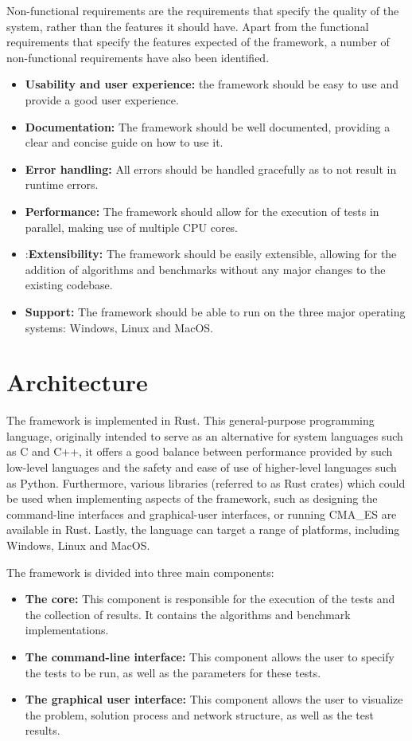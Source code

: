 Non-functional requirements are the requirements that specify the quality of the system, rather than the features it should have.
Apart from the functional requirements that specify the features expected of the framework, a number of non-functional requirements have also been identified.

\begin{itemize}
    \item \textbf{Usability and user experience:} the framework should be easy to use and provide a good user experience.
    \item \textbf{Documentation:} The framework should be well documented, providing a clear and concise guide on how to use it.
    \item \textbf{Error handling:} All errors should be handled gracefully as to not result in runtime errors.
    \item \textbf{Performance:} The framework should allow for the execution of tests in parallel, making use of multiple CPU cores.
    \item:\textbf{Extensibility:} The framework should be easily extensible, allowing for the addition of algorithms and benchmarks without any
    major changes to the existing codebase.
\item \textbf{Support:} The framework should be able to run on the three major operating systems: Windows, Linux and MacOS.
\end{itemize}

\section{Architecture}

The framework is implemented in Rust. This general-purpose programming language, originally intended to serve as an alternative for system languages such as C and
C++, it offers a good balance between performance provided by such low-level languages and the safety and ease of use of higher-level languages such as Python.
Furthermore, various libraries (referred to as Rust crates) which could be used when implementing aspects of the framework, such as designing the command-line interfaces
and graphical-user interfaces, or running CMA\_ES are available in Rust.
Lastly, the language can target a range of platforms, including Windows, Linux and MacOS.

The framework is divided into three main components:

\begin{itemize}
    \item \textbf{The core:} This component is responsible for the execution of the tests and the collection of results. It contains the algorithms and benchmark implementations.
    \item \textbf{The command-line interface:} This component allows the user to specify the tests to be run, as well as the parameters for these tests.
    \item \textbf{The graphical user interface:} This component allows the user to visualize the problem, solution process and network structure, as well as the test results.
\end{itemize}

